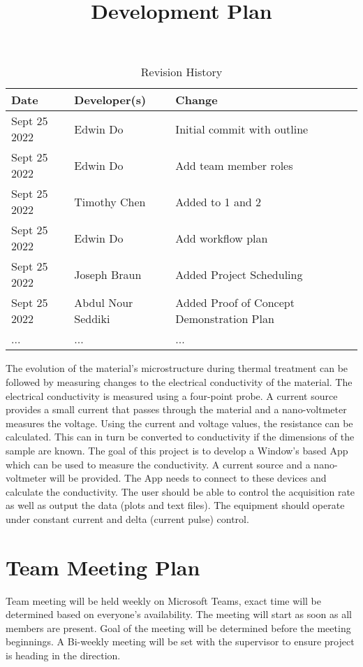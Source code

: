 \documentclass{article}
\title{Development Plan\\\progname}
\author{\authname}
\date{}
\begin{document}
\begin{table}[hp]
\caption{Revision History} \label{TblRevisionHistory}
\begin{tabularx}{\textwidth}{llX}
\toprule
\textbf{Date} & \textbf{Developer(s)} & \textbf{Change}\\
\midrule
Sept 25 2022 & Edwin Do & Initial commit with outline\\
Sept 25 2022 & Edwin Do & Add team member roles\\
Sept 25 2022 & Timothy Chen & Added to 1 and 2\\
Sept 25 2022 & Edwin Do & Add workflow plan \\
Sept 25 2022 & Joseph Braun & Added Project Scheduling \\
Sept 25 2022 & Abdul Nour Seddiki & Added Proof of Concept Demonstration Plan \\
... & ... & ...\\
\bottomrule
\end{tabularx}
\end{table}

\newpage

\maketitle

\indent The evolution of the material’s microstructure during thermal treatment can be followed by measuring changes to the electrical conductivity of the material. The electrical conductivity is measured using a four-point probe. A current source provides a small current that passes through the material and a nano-voltmeter measures the voltage. Using the current and voltage values, the resistance can be calculated. This can in turn be converted to conductivity if the dimensions of the sample are known. The goal of this project is to develop a Window’s based App which can be used to measure the conductivity. A current source and a nano- voltmeter will be provided. The App needs to connect to these devices and calculate the conductivity. The user should be able to control the acquisition rate as well as output the data (plots and text files). The equipment should operate under constant current and delta (current pulse) control.

\section{Team Meeting Plan}
Team meeting will be held weekly on Microsoft Teams, exact time will be determined based on everyone's availability.
The meeting will start as soon as all members are present. 
Goal of the meeting will be determined before the meeting beginnings. 
A Bi-weekly meeting will be set with the supervisor to ensure project is heading in the direction. 
\end{document}
